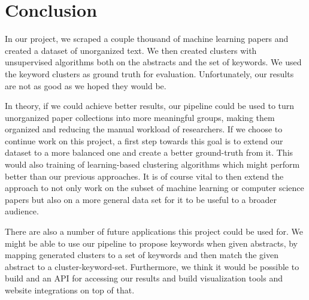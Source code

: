 \section{Conclusion}
In our project, we scraped a couple thousand of machine learning papers and created a dataset of unorganized text. We then created clusters with unsupervised algorithms both on the abstracts and the set of keywords.
We used the keyword clusters as ground truth for evaluation. Unfortunately, our results are not as good as we hoped they would be.

In theory, if we could achieve better results, our pipeline could be used to turn unorganized paper collections into more meaningful groups, making them organized and reducing the manual workload of researchers.
If we choose to continue work on this project, a first step towards this goal is to extend our dataset to a more balanced one and create a better ground-truth from it. This would also training of learning-based clustering algorithms which might perform better than our previous approaches.
It is of course vital to then extend the approach to not only work on the subset of machine learning or computer science papers but also on a more general data set for it to be useful to a broader audience.

There are also a number of future applications this project could be used for.
We might be able to use our pipeline to propose keywords when given abstracts, by mapping generated clusters to a set of keywords and then match the given abstract to a cluster-keyword-set.
Furthermore, we think it would be possible to build and an API for accessing our results and build visualization tools and website integrations on top of that. 
